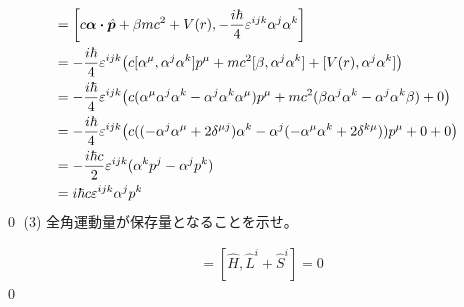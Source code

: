 \documentclass[uplatex,dvipdfmx,a4paper,11pt]{jlreq}
\makeatletter
\newcommand{\pp}{\bm{p}}
\theoremstyle{definition}
\renewenvironment{proof}[1][\proofname]{\par
  \normalfont
  \topsep6\p@\@plus6\p@ \trivlist
  \item[\hskip\labelsep{\bfseries #1}\@addpunct{\bfseries}]\ignorespaces\quad\par
}{%
  \qed\endtrivlist\@endpefalse
}
\renewcommand\proofname{証明}
\makeatother
\begin{document}
\begin{proof}
  \begin{align}
    [\hat{H}, \hat{S}^i] & = \qty[c\bm{\alpha}\vdot\hat{\pp} + \beta mc^2 + V(r), -\frac{i\hbar}{4}\varepsilon^{ijk}\alpha^j\alpha^k]                                                          \\
                         & = -\frac{i\hbar}{4}\varepsilon^{ijk}\qty(c[\alpha^\mu, \alpha^j\alpha^k]p^\mu + mc^2[\beta, \alpha^j\alpha^k] + [V(r), \alpha^j\alpha^k])                           \\
                         & = -\frac{i\hbar}{4}\varepsilon^{ijk}\qty(c(\alpha^\mu\alpha^j\alpha^k - \alpha^j\alpha^k\alpha^\mu)p^\mu + mc^2(\beta\alpha^j\alpha^k - \alpha^j\alpha^k\beta) + 0) \\
                         & = -\frac{i\hbar}{4}\varepsilon^{ijk}\qty(c((-\alpha^j\alpha^\mu + 2\delta^{\mu j})\alpha^k - \alpha^j(-\alpha^\mu\alpha^k + 2\delta^{k\mu}))p^\mu + 0 + 0)          \\
                         & = -\frac{i\hbar c}{2}\varepsilon^{ijk}(\alpha^kp^j - \alpha^jp^k)                                                                                                   \\
                         & = i\hbar c\varepsilon^{ijk}\alpha^jp^k
  \end{align}
\end{proof}
(3) 全角運動量が保存量となることを示せ。
\begin{proof}
  \begin{align}
    [\hat{H}, \hat{J}^i] & = [\hat{H}, \hat{L}^i + \hat{S}^i] = 0
  \end{align}
\end{proof}
\end{document}
